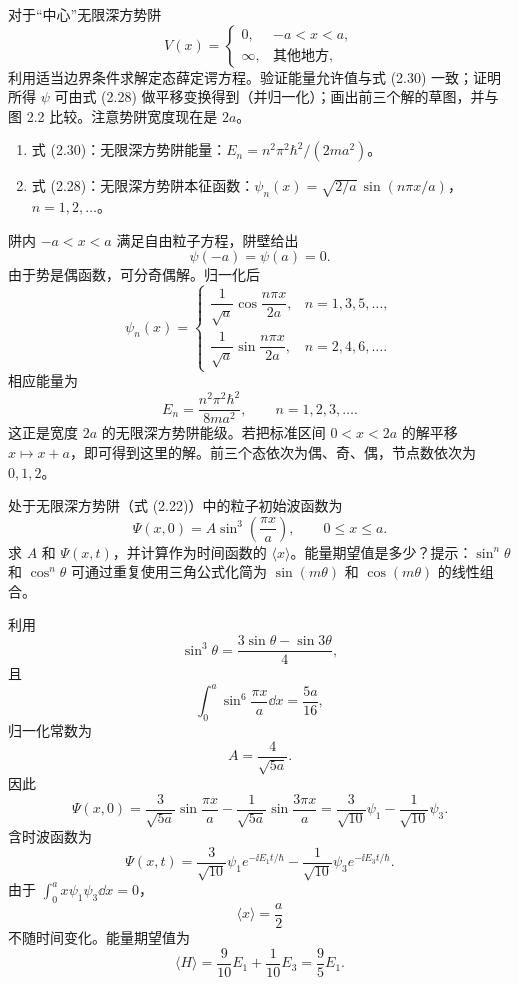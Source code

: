 \begin{question}
对于“中心”无限深方势阱
\[
V(x)=\begin{cases}0,&-a<x<a,\\ \infty,&\text{其他地方},
\end{cases}
\]
利用适当边界条件求解定态薛定谔方程。验证能量允许值与式 (2.30) 一致；证明所得 $\psi$ 可由式 (2.28) 做平移变换得到（并归一化）；画出前三个解的草图，并与图 2.2 比较。注意势阱宽度现在是 $2a$。

\par\smallskip
{}
\begin{enumerate}[leftmargin=2.2em,itemsep=0.12em,topsep=0.12em,parsep=0pt]
\item 式 (2.30)：无限深方势阱能量：$E_n=n^2\pi^2\hbar^2/(2ma^2)$。
\item 式 (2.28)：无限深方势阱本征函数：$\psi_n(x)=\sqrt{2/a}\,\sin(n\pi x/a)$，$n=1,2,\ldots$。
\end{enumerate}

\end{question}
\begin{solution}
阱内 $-a<x<a$ 满足自由粒子方程，阱壁给出
\[
\psi(-a)=\psi(a)=0.
\]
由于势是偶函数，可分奇偶解。归一化后
\[
\psi_n(x)=\begin{cases}
\dfrac1{\sqrt a}\cos\dfrac{n\pi x}{2a},& n=1,3,5,\ldots,\\[0.8em]
\dfrac1{\sqrt a}\sin\dfrac{n\pi x}{2a},& n=2,4,6,\ldots.
\end{cases}
\]
相应能量为
\[
E_n=\frac{n^2\pi^2\hbar^2}{8ma^2},
\qquad n=1,2,3,\ldots.
\]
这正是宽度 $2a$ 的无限深方势阱能级。若把标准区间 $0<x<2a$ 的解平移 $x\mapsto x+a$，即可得到这里的解。前三个态依次为偶、奇、偶，节点数依次为 $0,1,2$。
\end{solution}

\begin{question}
处于无限深方势阱（式 (2.22)）中的粒子初始波函数为
\[
\Psi(x,0)=A\sin^3\left(\frac{\pi x}{a}\right),\qquad 0\le x\le a.
\]
求 $A$ 和 $\Psi(x,t)$，并计算作为时间函数的 $\langle x\rangle$。能量期望值是多少？提示：$\sin^n\theta$ 和 $\cos^n\theta$ 可通过重复使用三角公式化简为 $\sin(m\theta)$ 和 $\cos(m\theta)$ 的线性组合。

\par\smallskip
{}

\end{question}
\begin{solution}
利用
\[
\sin^3\theta=\frac{3\sin\theta-\sin3\theta}{4},
\]
且
\[
\int_0^a\sin^6\frac{\pi x}{a}\dd x=\frac{5a}{16},
\]
归一化常数为
\[
A=\frac4{\sqrt{5a}}.
\]
因此
\[
\Psi(x,0)=\frac{3}{\sqrt{5a}}\sin\frac{\pi x}{a}-\frac1{\sqrt{5a}}\sin\frac{3\pi x}{a}
=\frac3{\sqrt{10}}\psi_1-\frac1{\sqrt{10}}\psi_3.
\]
含时波函数为
\[
\Psi(x,t)=\frac3{\sqrt{10}}\psi_1e^{-\ii E_1t/\hbar}
-\frac1{\sqrt{10}}\psi_3e^{-\ii E_3t/\hbar}.
\]
由于 $\int_0^a x\psi_1\psi_3\dd x=0$，
\[
\langle x\rangle=\frac{a}{2}
\]
不随时间变化。能量期望值为
\[
\langle H\rangle=\frac9{10}E_1+\frac1{10}E_3
=\frac95E_1.
\]
\end{solution}

